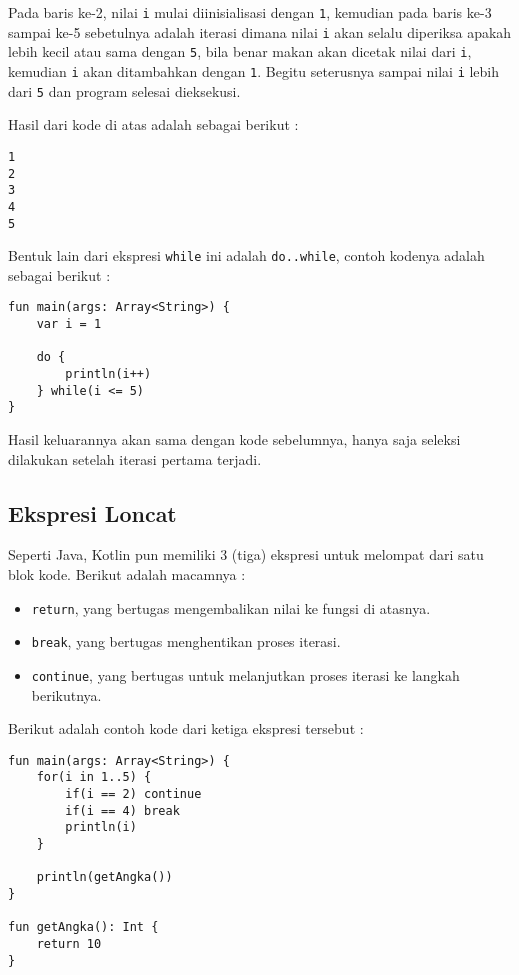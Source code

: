 Pada baris ke-2, nilai \texttt{i} mulai diinisialisasi dengan \texttt{1}, kemudian pada baris ke-3 sampai ke-5 sebetulnya adalah iterasi dimana nilai \texttt{i} akan selalu diperiksa apakah lebih kecil atau sama dengan \texttt{5}, bila benar makan akan dicetak nilai dari \texttt{i}, kemudian \texttt{i} akan ditambahkan dengan \texttt{1}. Begitu seterusnya sampai nilai \texttt{i} lebih dari \texttt{5} dan program selesai dieksekusi.

Hasil dari kode di atas adalah sebagai berikut :

\begin{lstlisting}
1
2
3
4
5
\end{lstlisting}

Bentuk lain dari ekspresi \texttt{while} ini adalah \texttt{do..while}, contoh kodenya adalah sebagai berikut :

\begin{lstlisting}
fun main(args: Array<String>) {
	var i = 1
	
	do {
		println(i++) 
	} while(i <= 5)
}
\end{lstlisting}

Hasil keluarannya akan sama dengan kode sebelumnya, hanya saja seleksi dilakukan setelah iterasi pertama terjadi.

\subsection{Ekspresi Loncat}

Seperti Java, Kotlin pun memiliki 3 (tiga) ekspresi untuk melompat dari satu blok kode. Berikut adalah macamnya :

\begin{itemize}
	\item \texttt{return}, yang bertugas mengembalikan nilai ke fungsi di atasnya.
	\item \texttt{break}, yang bertugas menghentikan proses iterasi.
	\item \texttt{continue}, yang bertugas untuk melanjutkan proses iterasi ke langkah berikutnya.
\end{itemize}

Berikut adalah contoh kode dari ketiga ekspresi tersebut :

\begin{lstlisting}
fun main(args: Array<String>) {
	for(i in 1..5) {
		if(i == 2) continue
		if(i == 4) break
		println(i)
	}
	
	println(getAngka())
}

fun getAngka(): Int {
	return 10
}
\end{lstlisting}

